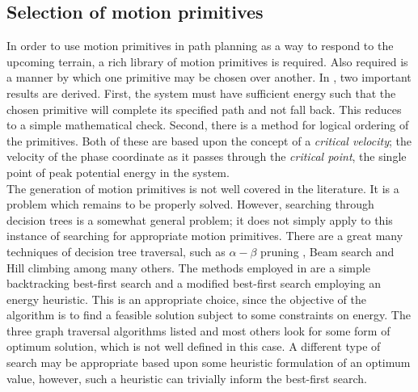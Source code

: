 \subsection{Selection of motion primitives}\label{sec:selection}
In order to use motion primitives in path planning as a way to respond to the upcoming terrain, a rich library of motion primitives is required. Also required is a manner by which one primitive may be chosen over another. In \cite{manchester13planning}, two important results are derived. First, the system must have sufficient energy such that the chosen primitive will complete its specified path and not fall back. This reduces to a simple mathematical check. Second, there is a method for logical ordering of the primitives. Both of these are based upon the concept of a \textit{critical velocity}; the velocity of the phase coordinate as it passes through the \textit{critical point}, the single point of peak potential energy in the system. \\

The generation of motion primitives is not well covered in the literature. It is a problem which remains to be properly solved. However, searching through decision trees is a somewhat general problem; it does not simply apply to this instance of searching for appropriate motion primitives. There are a great many techniques of decision tree traversal, such as $\alpha-\beta$ pruning \cite{knuth1976analysis}, Beam search \cite{steinbiss1994improvements} and Hill climbing \cite{goldfeld1966maximization} among many others. The methods employed in \cite{manchester13planning} are a simple backtracking best-first search and a modified best-first search employing an energy heuristic. This is an appropriate choice, since the objective of the algorithm is to find a feasible solution subject to some constraints on energy. The three graph traversal algorithms listed and most others look for some form of optimum solution, which is not well defined in this case. A different type of search may be appropriate based upon some heuristic formulation of an optimum value, however, such a heuristic can trivially inform the best-first search.